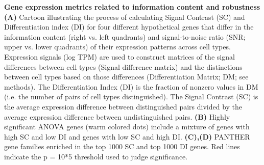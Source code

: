 \textbf{Gene expression metrics related to information content and robustness} \textbf{(A)} Cartoon illustrating the process of calculating Signal Contrast (SC) and Differentiation index (DI) for four different hypothetical genes that differ in the information content (right vs. left quadrants) and signal-to-noise ratio (SNR; upper vs. lower quadrants) of their expression patterns across cell types. Expression signals (log TPM) are used to construct matrices of the signal differences between cell types (Signal difference matrix) and the distinctions between cell types based on those differences (Differentiation Matrix; DM; see methods). The Differentiation Index (DI) is the fraction of nonzero values in DM (i.e. the number of pairs of cell types distinguished). The Signal Contrast (SC) is the average expression difference between distinguished pairs divided by the average expression difference between undistinguished pairs. \textbf{(B)} Highly significant ANOVA genes (warm colored dots) include a mixture of genes with high SC and low DI and genes with low SC and high DI. \textbf{(C),(D)} PANTHER gene families enriched in the top 1000 SC and top 1000 DI genes. Red lines indicate the p = 10*5 threshold used to judge significance. 